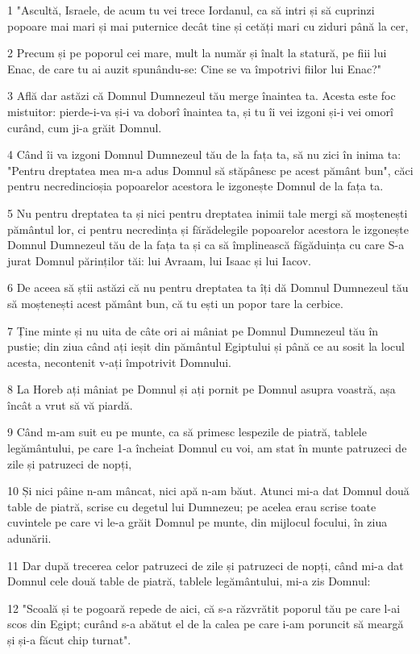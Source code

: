 \par 1 "Ascultă, Israele, de acum tu vei trece Iordanul, ca să intri și să cuprinzi popoare mai mari și mai puternice decât tine și cetăți mari cu ziduri până la cer,
\par 2 Precum și pe poporul cei mare, mult la număr și înalt la statură, pe fiii lui Enac, de care tu ai auzit spunându-se: Cine se va împotrivi fiilor lui Enac?"
\par 3 Află dar astăzi că Domnul Dumnezeul tău merge înaintea ta. Acesta este foc mistuitor: pierde-i-va și-i va doborî înaintea ta, și tu îi vei izgoni și-i vei omorî curând, cum ji-a grăit Domnul.
\par 4 Când îi va izgoni Domnul Dumnezeul tău de la fața ta, să nu zici în inima ta: "Pentru dreptatea mea m-a adus Domnul să stăpânesc pe acest pământ bun", căci pentru necredincioșia popoarelor acestora le izgonește Domnul de la fața ta.
\par 5 Nu pentru dreptatea ta și nici pentru dreptatea inimii tale mergi să moștenești pământul lor, ci pentru necredința și fărădelegile popoarelor acestora le izgonește Domnul Dumnezeul tău de la fața ta și ca să împlinească făgăduința cu care S-a jurat Domnul părinților tăi: lui Avraam, lui Isaac și lui Iacov.
\par 6 De aceea să știi astăzi că nu pentru dreptatea ta îți dă Domnul Dumnezeul tău să moștenești acest pământ bun, că tu ești un popor tare la cerbice.
\par 7 Ține minte și nu uita de câte ori ai mâniat pe Domnul Dumnezeul tău în pustie; din ziua când ați ieșit din pământul Egiptului și până ce au sosit la locul acesta, necontenit v-ați împotrivit Domnului.
\par 8 La Horeb ați mâniat pe Domnul și ați pornit pe Domnul asupra voastră, așa încât a vrut să vă piardă.
\par 9 Când m-am suit eu pe munte, ca să primesc lespezile de piatră, tablele legământului, pe care 1-a încheiat Domnul cu voi, am stat în munte patruzeci de zile și patruzeci de nopți,
\par 10 Și nici pâine n-am mâncat, nici apă n-am băut. Atunci mi-a dat Domnul două table de piatră, scrise cu degetul lui Dumnezeu; pe acelea erau scrise toate cuvintele pe care vi le-a grăit Domnul pe munte, din mijlocul focului, în ziua adunării.
\par 11 Dar după trecerea celor patruzeci de zile și patruzeci de nopți, când mi-a dat Domnul cele două table de piatră, tablele legământului, mi-a zis Domnul:
\par 12 "Scoală și te pogoară repede de aici, că s-a răzvrătit poporul tău pe care l-ai scos din Egipt; curând s-a abătut el de la calea pe care i-am poruncit să meargă și și-a făcut chip turnat".
